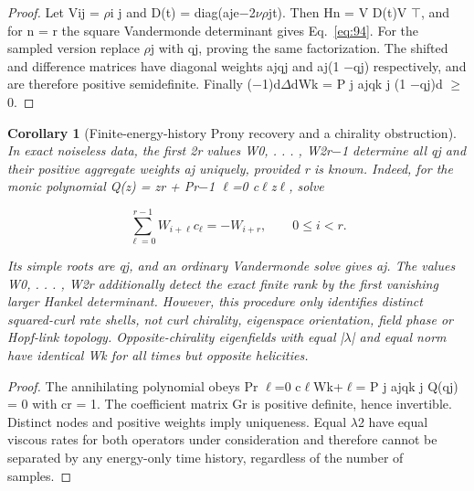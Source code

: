 \documentclass[10pt,letterpaper]{article}
\newtheorem{corollary}[theorem]{Corollary}
\theoremstyle{remark}
\begin{document}
\begin{proof}
Let Vij = \(\rho \)i j and D(t) = diag(aje\(- \)2\(\nu \rho \)jt). Then Hn = V D(t)V \(\top \), and for n = r the square Vandermonde determinant gives Eq.~\eqref{eq:94}. For the sampled version replace \(\rho \)j with qj, proving the same factorization. The shifted and difference matrices have diagonal weights ajqj and aj(1 \(- \)qj) respectively, and are therefore positive semidefinite. Finally (\(- \)1)d\(\Delta \)dWk = P j ajqk j (1 \(- \)qj)d \(\ge \)0.

\end{proof}

\begin{corollary}[Finite-energy-history Prony recovery and a chirality obstruction]

In exact noiseless data, the first 2r values W0, . . . , W2r\(- \)1 determine all qj and their positive aggregate weights aj uniquely, provided r is known. Indeed, for the monic polynomial Q(z) = zr + Pr\(- \)1 \(\ell \)=0 c\(\ell \)z\(\ell \), solve


\begin{equation}
\tag{97}\label{eq:97}
\sum_{\ell=0}^{r-1}W_{i+\ell}c_\ell=-W_{i+r},\qquad0\le i<r.
\end{equation}

Its simple roots are qj, and an ordinary Vandermonde solve gives aj. The values W0, . . . , W2r additionally detect the exact finite rank by the first vanishing larger Hankel determinant. However, this procedure only identifies distinct squared-curl rate shells, not curl chirality, eigenspace orientation, field phase or Hopf-link topology. Opposite-chirality eigenfields with equal |\(\lambda \)| and equal norm have identical Wk for all times but opposite helicities.


\end{corollary}

\begin{proof}
The annihilating polynomial obeys Pr \(\ell \)=0 c\(\ell \)Wk+\(\ell \)= P j ajqk j Q(qj) = 0 with cr = 1. The coefficient matrix Gr is positive definite, hence invertible. Distinct nodes and positive weights imply uniqueness. Equal \(\lambda \)2 have equal viscous rates for both operators under consideration and therefore cannot be separated by any energy-only time history, regardless of the number of samples.

\end{proof}
\end{document}
